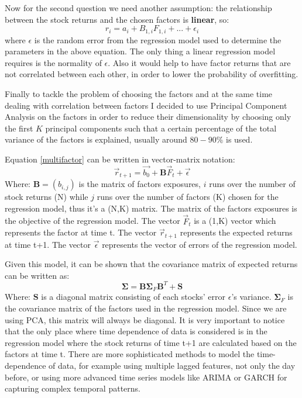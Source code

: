 Now for the second question we need another assumption: the relationship between the stock returns and the chosen factors is \textbf{linear}, so:
\begin{equation}
    r_i = a_i + B_{1,i}F_{1,i} + ... + \epsilon_i
    \label{multifactor}
\end{equation}
where $\epsilon$ is the random error from the regression model used to determine the parameters in the above equation. The only thing a linear regression model requires is the normality of $\epsilon$. Also it would help to have factor returns that are not correlated between each other, in order to lower the probability of overfitting.

Finally to tackle the problem of choosing the factors and at the same time dealing with correlation between factors I decided to use Principal Component Analysis on the factors in order to reduce their dimensionality by choosing only the first $K$ principal components such that a certain percentage of the total variance of the factors is explained, usually around $80-90\%$ is used.

Equation \eqref{multifactor} can be written in vector-matrix notation:
\begin{equation}
    \Vec{r}_{t+1} = \vec{b_0} + \mathbf{B}\vec{F}_{t} + \vec{\epsilon}
\end{equation}
Where: $\mathbf{B} = (b_{i,j})$ is the matrix of factors exposures, $i$ runs over the number of stock returns (N) while $j$ runs over the number of factors (K) chosen for the regression model, thus it's a (N,K) matrix. The matrix of the factors exposures is the objective of the regression model. The vector $\vec{F}_{t}$ is a (1,K) vector which represents the factor at time t. The vector $\vec{r}_{t+1}$ represents the expected returns at time t+1. The vector $\vec{\epsilon}$ represents the vector of errors of the regression model.

Given this model, it can be shown that the covariance matrix of expected returns can be written as:
\begin{equation}
    \mathbf{\Sigma} = \mathbf{B}\mathbf{\Sigma}_{F}\mathbf{B}^{T} + \mathbf{S}
    \label{cov-matrix-returns}
\end{equation}
Where: $\mathbf{S}$ is a diagonal matrix consisting of each stocks' error $\epsilon$'s variance. $\mathbf{\Sigma}_{F}$ is the covariance matrix of the factors used in the regression model. Since we are using PCA, this matrix will always be diagonal.
It is very important to notice that the only place where time dependence of data is considered is in the regression model where the stock returns of time t+1 are calculated based on the factors at time t. There are more sophisticated methods to model the time-dependence of data, for example using multiple lagged features, not only the day before, or using more advanced time series models like ARIMA or GARCH for capturing complex temporal patterns.


